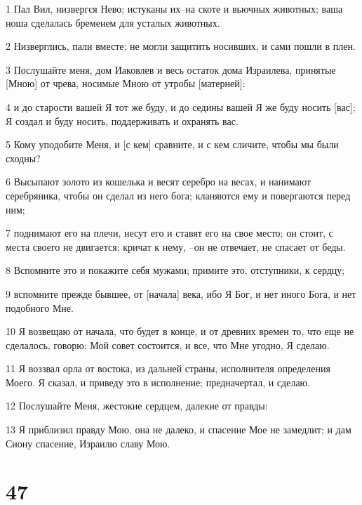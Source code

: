 \par 1 Пал Вил, низвергся Нево; истуканы их--на скоте и вьючных животных; ваша ноша сделалась бременем для усталых животных.
\par 2 Низверглись, пали вместе; не могли защитить носивших, и сами пошли в плен.
\par 3 Послушайте меня, дом Иаковлев и весь остаток дома Израилева, принятые [Мною] от чрева, носимые Мною от утробы [матерней]:
\par 4 и до старости вашей Я тот же буду, и до седины вашей Я же буду носить [вас]; Я создал и буду носить, поддерживать и охранять вас.
\par 5 Кому уподобите Меня, и [с кем] сравните, и с кем сличите, чтобы мы были сходны?
\par 6 Высыпают золото из кошелька и весят серебро на весах, и нанимают серебряника, чтобы он сделал из него бога; кланяются ему и повергаются перед ним;
\par 7 поднимают его на плечи, несут его и ставят его на свое место; он стоит, с места своего не двигается; кричат к нему, --он не отвечает, не спасает от беды.
\par 8 Вспомните это и покажите себя мужами; примите это, отступники, к сердцу;
\par 9 вспомните прежде бывшее, от [начала] века, ибо Я Бог, и нет иного Бога, и нет подобного Мне.
\par 10 Я возвещаю от начала, что будет в конце, и от древних времен то, что еще не сделалось, говорю: Мой совет состоится, и все, что Мне угодно, Я сделаю.
\par 11 Я воззвал орла от востока, из дальней страны, исполнителя определения Моего. Я сказал, и приведу это в исполнение; предначертал, и сделаю.
\par 12 Послушайте Меня, жестокие сердцем, далекие от правды:
\par 13 Я приблизил правду Мою, она не далеко, и спасение Мое не замедлит; и дам Сиону спасение, Израилю славу Мою.

\chapter{47}

